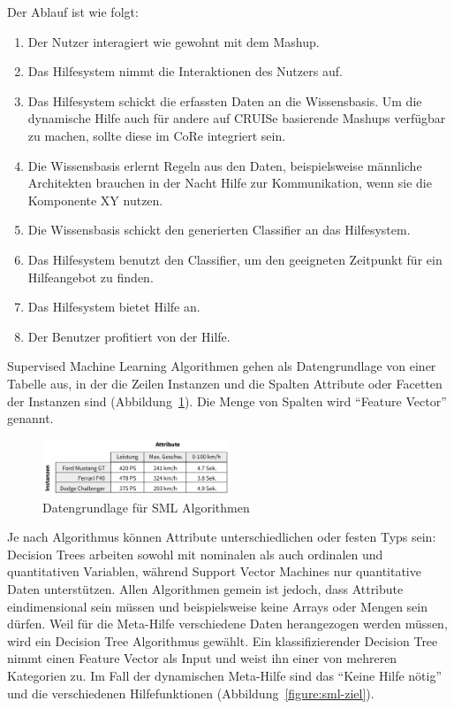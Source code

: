 \documentclass[
	headsepline,
	footsepline,
	fontsize=12pt,
	bibliography=totoc
]{scrbook}
\begin{document}
Der Ablauf ist wie folgt:

\begin{enumerate}
	\item Der Nutzer interagiert wie gewohnt mit dem Mashup.
	\item Das Hilfesystem nimmt die Interaktionen des Nutzers auf.
	\item Das Hilfesystem schickt die erfassten Daten an die Wissensbasis. Um die dynamische Hilfe auch für andere auf CRUISe basierende Mashups verfügbar zu machen, sollte diese im CoRe integriert sein.
	\item Die Wissensbasis erlernt Regeln aus den Daten, beispielsweise männliche Architekten brauchen in der Nacht Hilfe zur Kommunikation, wenn sie die Komponente XY nutzen.
	\item Die Wissensbasis schickt den generierten Classifier an das Hilfesystem.
	\item Das Hilfesystem benutzt den Classifier, um den geeigneten Zeitpunkt für ein Hilfeangebot zu finden.
	\item Das Hilfesystem bietet Hilfe an.
	\item Der Benutzer profitiert von der Hilfe.
\end{enumerate}

Supervised Machine Learning Algorithmen gehen als Datengrundlage von einer Tabelle aus, in der die Zeilen Instanzen und die Spalten Attribute oder Facetten der Instanzen sind (Abbildung~\ref{figure:sml-daten}). Die Menge von Spalten wird \enquote{Feature Vector} genannt. 

\begin{figure}[htbp]
   \centering
   \includegraphics[width=0.5\textwidth]{images/konzeption-sml-daten.png}
   \caption{Datengrundlage für SML Algorithmen}
   \label{figure:sml-daten}
\end{figure}

Je nach Algorithmus können Attribute unterschiedlichen oder festen Typs sein: Decision Trees arbeiten sowohl mit nominalen als auch ordinalen und quantitativen Variablen, während Support Vector Machines nur quantitative Daten unterstützen. Allen Algorithmen gemein ist jedoch, dass Attribute eindimensional sein müssen und beispielsweise keine Arrays oder Mengen sein dürfen. Weil für die Meta-Hilfe verschiedene Daten herangezogen werden müssen, wird ein Decision Tree Algorithmus gewählt. Ein klassifizierender Decision Tree nimmt einen Feature Vector als Input und weist ihn einer von mehreren Kategorien zu. Im Fall der dynamischen Meta-Hilfe sind das \enquote{Keine Hilfe nötig} und die verschiedenen Hilfefunktionen (Abbildung~\ref{figure:sml-ziel}).
\end{document}
